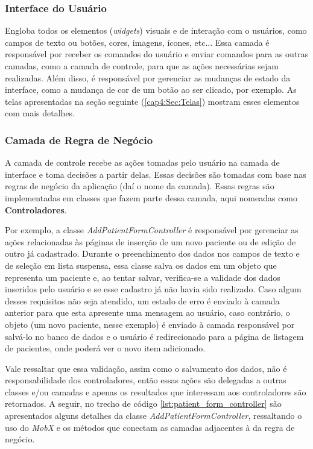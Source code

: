 \subsubsection{Interface do Usuário}
\label{cap4:SubSubSec:UI}
Engloba todos os elementos (\textit{widgets}) visuais e de interação com o usuários, como campos de texto ou botões, cores, imagens, ícones, etc... Essa camada é responsável por receber os comandos do usuário e enviar comandos para as outras camadas, como a camada de controle, para que as ações necessárias sejam realizadas. Além disso, é responsável por gerenciar as mudanças de estado da interface, como a mudança de cor de um botão ao ser clicado, por exemplo. As telas apresentadas na seção seguinte (\ref{cap4:Sec:Telas}) mostram esses elementos com mais detalhes.

\subsubsection{Camada de Regra de Negócio}
\label{cap4:SubSubSec:RegraNegocio}
A camada de controle recebe as ações tomadas pelo usuário na camada de interface e toma decisões a partir delas. Essas decisões são tomadas com base nas regras de negócio da aplicação (daí o nome da camada). Essas regras são implementadas em classes que fazem parte dessa camada, aqui nomeadas como \textbf{Controladores}.

Por exemplo, a classe \textit{AddPatientFormController} é responsável por gerenciar as ações relacionadas às páginas de inserção de um novo paciente ou de edição de outro já cadastrado. Durante o preenchimento dos dados nos campos de texto e de seleção em lista suspensa, essa classe salva os dados em um objeto que representa um paciente e, ao tentar salvar, verifica-se a validade dos dados inseridos pelo usuário e se esse cadastro já não havia sido realizado. Caso algum desses requisitos não seja atendido, um estado de erro é enviado à camada anterior para que esta apresente uma mensagem ao usuário, caso contrário, o objeto (um novo paciente, nesse exemplo) é enviado à camada responsável por salvá-lo no banco de dados e o usuário é redirecionado para a página de listagem de pacientes, onde poderá ver o novo item adicionado.

Vale ressaltar que essa validação, assim como o salvamento dos dados, não é responsabilidade dos controladores, então essas ações são delegadas a outras classes e/ou camadas e apenas os resultados que interessam aos controladores são retornados. A seguir, no trecho de código \ref{lst:patient_form_controller} são apresentados alguns detalhes da classe \textit{AddPatientFormController}, ressaltando o uso do \textit{MobX} e os métodos que conectam as camadas adjacentes à da regra de negócio.

